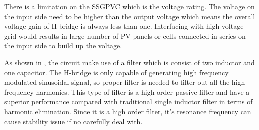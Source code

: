 There is a limitation on the \gls{SSGPVC} which is the voltage rating. The voltage on the input side need to be higher than the output voltage which means the overall voltage gain of H-bridge is always less than one. Interfacing with high voltage grid would results in large number of \gls{PV} panels or cells connected in series on the input side to build up the voltage. 

As shown in , the circuit make use of a filter which is consist of two inductor and one capacitor. The H-bridge is only capable of generating high frequency modulated sinusoidal signal, so proper filter is needed to filter out all the high frequency harmonics. This type of filter is a high order passive filter and have a superior performance compared with traditional single inductor filter in terms of harmonic elimination. Since it is a high order filter, it's resonance frequency can cause stability issue if no carefully deal with\cite{RN15}.